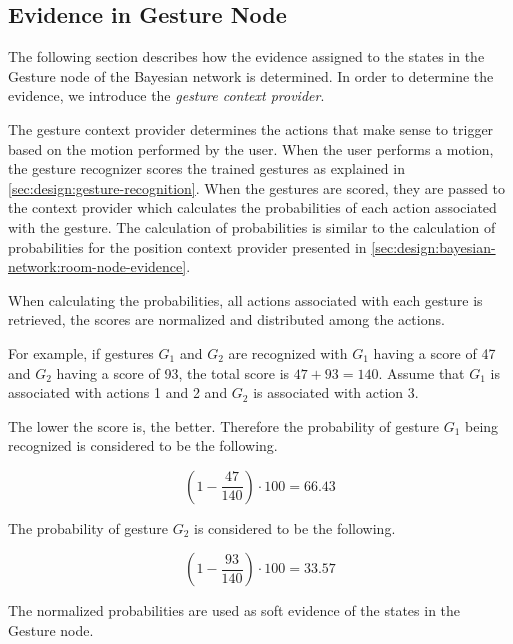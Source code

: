 \subsection{Evidence in Gesture Node}
\label{sec:design:bayesian-network:pgesture-node-evidence}

The following section describes how the evidence assigned to the states in the Gesture node of the Bayesian network is determined. In order to determine the evidence, we introduce the \emph{gesture context provider}.

The gesture context provider determines the actions that make sense to trigger based on the motion performed by the user. When the user performs a motion, the gesture recognizer scores the trained gestures as explained in \cref{sec:design:gesture-recognition}. When the gestures are scored, they are passed to the context provider which calculates the probabilities of each action associated with the gesture. The calculation of probabilities is similar to the calculation of probabilities for the position context provider presented in \cref{sec:design:bayesian-network:room-node-evidence}.

When calculating the probabilities, all actions associated with each gesture is retrieved, the scores are normalized and distributed among the actions.

For example, if gestures $G_1$ and $G_2$ are recognized with $G_1$ having a score of 47 and $G_2$ having a score of 93, the total score is $47 + 93 = 140$. Assume that $G_1$ is associated with actions 1 and 2 and $G_2$ is associated with action 3.

The lower the score is, the better. Therefore the probability of gesture $G_1$ being recognized is considered to be the following.

\begin{equation*}
(1 - \frac{47}{140}) \cdot 100 = 66.43
\end{equation*}

The probability of gesture $G_2$ is considered to be the following.

\begin{equation*}
(1 - \frac{93}{140}) \cdot 100 = 33.57
\end{equation*}

The normalized probabilities are used as soft evidence of the states in the Gesture node.


